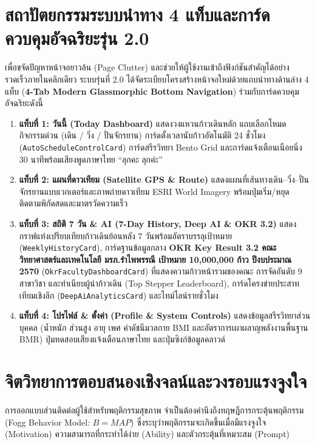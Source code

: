 \section{สถาปัตยกรรมระบบนำทาง 4 แท็บและการ์ดควบคุมอัจฉริยะรุ่น 2.0}
เพื่อขจัดปัญหาหน้าจอยาวล้น (Page Clutter) และช่วยให้ผู้ใช้งานเข้าถึงฟังก์ชันสำคัญได้อย่างรวดเร็วภายในคลิกเดียว ระบบรุ่นที่ 2.0 ได้จัดระเบียบโครงสร้างหน้าจอใหม่ด้วยแถบนำทางด้านล่าง 4 แท็บ (\textbf{4-Tab Modern Glassmorphic Bottom Navigation}) ร่วมกับการ์ดควบคุมอัจฉริยะดังนี้
\begin{enumerate}
    \item \textbf{แท็บที่ 1: วันนี้ (Today Dashboard)} แสดงวงแหวนก้าวเดินหลัก แถบเลือกโหมดกิจกรรมด่วน (เดิน / วิ่ง / ปั่นจักรยาน) การ์ดตั้งเวลานับก้าวอัตโนมัติ 24 ชั่วโมง (\texttt{AutoScheduleControlCard}) การ์ดสรีรวิทยา Bento Grid และการ์ดแจ้งเตือนเนือยนิ่ง 30 นาทีพร้อมเสียงพูดภาษาไทย ``ลุกคะ ลุกค่ะ''
    \item \textbf{แท็บที่ 2: แผนที่ดาวเทียม (Satellite GPS \& Route)} แสดงแผนที่เส้นทางเดิน--วิ่ง--ปั่นจักรยานแบบเวกเตอร์และภาพถ่ายดาวเทียม ESRI World Imagery พร้อมปุ่มเริ่ม/หยุดติดตามพิกัดสดและมาตรวัดความเร็ว
    \item \textbf{แท็บที่ 3: สถิติ 7 วัน \& AI (7-Day History, Deep AI \& OKR 3.2)} แสดงกราฟแท่งเปรียบเทียบก้าวเดินย้อนหลัง 7 วันพร้อมอัตราบรรลุเป้าหมาย (\texttt{WeeklyHistoryCard}), การ์ดฐานข้อมูลกลาง \textbf{OKR Key Result 3.2 คณะวิทยาศาสตร์และเทคโนโลยี มรภ.รำไพพรรณี เป้าหมาย 10,000,000 ก้าว ปีงบประมาณ 2570} (\texttt{OkrFacultyDashboardCard}) ที่แสดงความก้าวหน้ารวมของคณะ การจัดอันดับ 9 สาขาวิชา และทำเนียบผู้นำก้าวเดิน (Top Stepper Leaderboard), การ์ดโครงข่ายประสาทเทียมเชิงลึก (\texttt{DeepAiAnalyticsCard}) และไทม์ไลน์รายชั่วโมง
    \item \textbf{แท็บที่ 4: โปรไฟล์ \& ตั้งค่า (Profile \& System Controls)} แสดงข้อมูลสรีรวิทยาส่วนบุคคล (น้ำหนัก ส่วนสูง อายุ เพศ ค่าดัชนีมวลกาย BMI และอัตราการเผาผลาญพลังงานพื้นฐาน BMR) ปุ่มทดสอบเสียงแจ้งเตือนภาษาไทย และปุ่มซิงก์ข้อมูลคลาวด์
\end{enumerate}

\section{จิตวิทยาการตอบสนองเชิงจลน์และวงรอบแรงจูงใจ}
การออกแบบส่วนติดต่อผู้ใช้สำหรับพฤติกรรมสุขภาพ จำเป็นต้องคำนึงถึงทฤษฎีการกระตุ้นพฤติกรรม (Fogg Behavior Model: $B = MAP$) ซึ่งระบุว่าพฤติกรรมจะเกิดขึ้นเมื่อมีแรงจูงใจ (Motivation) ความสามารถที่กระทำได้ง่าย (Ability) และตัวกระตุ้นที่เหมาะสม (Prompt)

